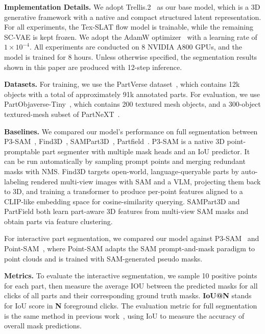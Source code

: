 \noindent \textbf{Implementation Details.}
%
We adopt Trellis.2~\cite{trellis2} as our base model, which is a 3D generative framework with a native and compact structured latent representation. 
%
For all experiments, the Tex-SLAT flow model is trainable, while the remaining SC-VAE is kept frozen.
%
We adopt the AdamW optimizer~\cite{adamw} with a learning rate of $1\times10^{-4}$. All experiments are conducted on 8 NVIDIA A800 GPUs, and the model is trained for  8 hours.
%
Unless otherwise specified, the segmentation results shown in this paper are produced with 12-step inference.

\noindent \textbf{Datasets.} %
For training, we use the PartVerse dataset~\cite{copartpartverse}, which contains 12k objects with a total of approximately 91k annotated parts.
%
For evaluation, we use PartObjaverse-Tiny~\cite{sampart3d}, which contains 200 textured mesh objects, and a 300-object textured-mesh subset of PartNeXT~\cite{partnext}.


\noindent \textbf{Baselines.}
We compared our model's performance on full segmentation between P3-SAM~\cite{p3sam}, Find3D~\cite{find3d}, SAMPart3D~\cite{sampart3d}, Partfield~\cite{partfield}.
P3-SAM is a native 3D point-promptable part segmenter with multiple mask heads and an IoU predictor. It can be run automatically by sampling prompt points and merging redundant masks with NMS.
Find3D targets open-world, language-queryable parts by auto-labeling rendered multi-view images with SAM and a VLM, projecting them back to 3D, and training a transformer to produce per-point features aligned to a CLIP-like embedding space for cosine-similarity querying.
SAMPart3D and PartField both learn part-aware 3D features from multi-view SAM masks and obtain parts via feature clustering.

For interactive part segmentation, we compared our model against P3-SAM~\cite{p3sam} and Point-SAM~\cite{pointsam}, where Point-SAM adapts the SAM prompt-and-mask paradigm to point clouds and is trained with SAM-generated pseudo masks.

\noindent \textbf{Metrics.}
To evaluate the interactive segmentation, we sample 10 positive points for each part, then measure the average IOU between the predicted masks for all clicks of all parts and their corresponding ground truth masks. \textbf{IoU@N} stands for IoU score in \textbf{N} foreground clicks.
The evaluation metric for full segmentation is the same method in previous work~\cite{p3sam,partfield}, using IoU to measure the accuracy of overall mask predictions. 

